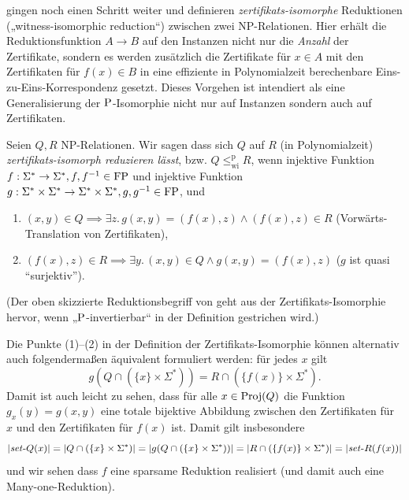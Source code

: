 \textcite{wiedermann_witness-isomorphic_1995} gingen noch einen Schritt weiter und definieren \emph{zertifikats-isomorphe} Reduktionen („witness-isomorphic reduction“) zwischen zwei NP-Relationen. Hier erhält die Reduktionsfunktion $A\to B$ auf den Instanzen nicht nur die \emph{Anzahl} der Zertifikate, sondern es werden zusätzlich die Zertifikate für $x\in A$ mit den Zertifikaten für $f(x)\in B$ in eine effiziente in Polynomialzeit berechenbare Eins-zu-Eins-Korrespondenz gesetzt. Dieses Vorgehen ist intendiert als eine Generalisierung der $\P$-Isomorphie nicht nur auf Instanzen sondern auch auf Zertifikaten.

\begin{definition}\label{def:wi-reduction}
    Seien $Q, R$ NP-Relationen. Wir sagen dass sich $Q$ auf $R$ (in Polynomialzeit) \emph{zertifikats-isomorph reduzieren lässt}, bzw. $Q\leq_\mathrm{wi}^\mathrm p R$, wenn injektive Funktion $f:\Sigma^*\to\Sigma^*, f, f^{-1}\in \FP$ und injektive Funktion $g:\Sigma^*\times\Sigma^*\to\Sigma^*\times\Sigma^*, g, g^{-1}\in\FP$, und
    \begin{enumerate}
        \item $(x,y)\in Q \implies \exists z.\,g(x,y) = (f(x), z) \land (f(x), z)\in R$ (Vorwärts-Translation von Zertifikaten),
        \item $(f(x),z)\in R \implies \exists y.\, (x,y)\in Q\land g(x,y)=(f(x), z)$ ($g$ ist quasi “surjektiv”). \qedhere
    \end{enumerate}
\end{definition}
(Der oben skizzierte Reduktionsbegriff von \textcite{lynch_structure_1978} geht aus der Zertifikats-Isomorphie hervor, wenn „$\P$-invertierbar“ in der Definition gestrichen wird.)

Die Punkte (1)–(2) in der Definition der Zertifikats-Isomorphie können alternativ auch folgendermaßen äquivalent formuliert werden:  für jedes $x$ gilt
\begin{equation}\label{eq:pars-wi} g(Q\cap(\{x\}\times\Sigma^*))  = R \cap (\{f(x)\}\times\Sigma^*).  \end{equation}
Damit ist auch leicht zu sehen, dass für alle $x\in\Proj(Q)$ die Funktion $g_x(y)= g(x,y)$ eine totale bijektive Abbildung zwischen den Zertifikaten für $x$ und den Zertifikaten für $f(x)$ ist. 
Damit gilt insbesondere
\[ |\fset{}Q(x)|=|Q\cap(\{x\}\times\Sigma^*)|=|g(Q\cap(\{x\}\times\Sigma^*))|=|R \cap (\{f(x)\}\times\Sigma^*)|=|\fset{}R(f(x))| \]
und wir sehen dass $f$ eine sparsame Reduktion realisiert (und damit auch eine Many-one-Reduktion).

